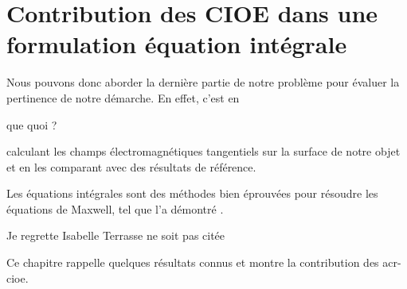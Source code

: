 \chapter{Contribution des CIOE dans une formulation équation intégrale}
\label{sec:equation_integrale}
\minitoc
\newpage
{}
Nous pouvons donc aborder la dernière partie de notre problème pour évaluer la pertinence de notre démarche.
En effet, c'est en
\begin{REM}
  que quoi ?
\end{REM}  calculant les champs électromagnétiques tangentiels sur la surface de notre objet et en les comparant avec des résultats de référence.

Les équations intégrales sont des méthodes bien éprouvées pour résoudre les équations de Maxwell, tel que l'a démontré \cite{nedelec_acoustic_2001}.
\begin{REM}
  Je regrette Isabelle Terrasse ne soit pas citée
\end{REM} 
Ce chapitre rappelle quelques résultats connus et montre la contribution des \gls{acr-cioe}.




